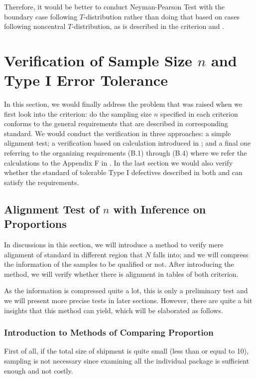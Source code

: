 \documentclass[12pt]{article}
\begin{document}
Therefore, it would be better to conduct Neyman-Pearson Test with the boundary case following $T$-distribution rather than doing that based on cases following noncentral $T$-distribution, as is described in the criterion \cite{JJF2005} and \cite{OIML2016}.

\section{Verification of Sample Size $n$ and Type I Error Tolerance}

In this section, we would finally address the problem that was raised when we first look into the criterion: do the sampling size $n$ specified in each criterion conforms to the general requirements that are described in corresponding standard. We would conduct the verification in three approaches: a simple alignment test; a verification based on calculation introduced in \cite{OIML2016}; and a final one referring to the organizing requirements (B.1) through (B.4) where we refer the calculations to the Appendix F in \cite{OIML2016}. In the last section we would also verify whether the standard of tolerable Type I defectives described in both \cite{JJF2005} and \cite{OIML2016} can satisfy the requirements.

\subsection{Alignment Test of $n$ with Inference on Proportions}

In discussions in this section, we will introduce a method to verify mere alignment of standard in different region that $N$ falls into; and we will compress the information of the samples to be qualified or not. After introducing the method, we will verify whether there is alignment in tables of both criterion.

As the information is compressed quite a lot, this is only a preliminary test and we will present more precise tests in later sections. However, there are quite a bit insights that this method can yield, which will be elaborated as follows.

\subsubsection{Introduction to Methods of Comparing Proportion}

First of all, if the total size of shipment is quite small (less than or equal to 10), sampling is not necessary since examining all the individual package is sufficient enough and not costly. 
\end{document}
